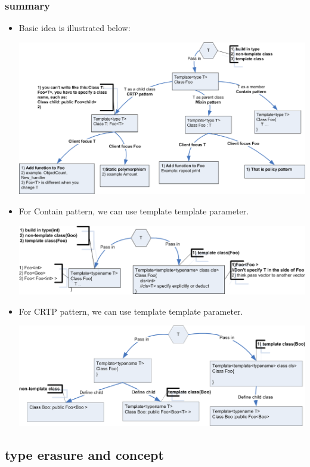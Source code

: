 \documentclass[a4paper,11pt,twoside]{book}
\begin{document}
\subsubsection{summary}
\begin{itemize}
	\item Basic idea is illustrated below:

		\includegraphics[width=0.9\linewidth]{pics/mixin.png}

	
	\item For Contain pattern, we can use template template parameter.

		\includegraphics[width=0.9\linewidth]{pics/mixin_tt.png}

	
	\item For CRTP pattern, we can use template template parameter.

		\includegraphics[width=0.9\linewidth]{pics/crtp_tt.png}

\end{itemize}


\subsection{type erasure and concept}
\end{document}

